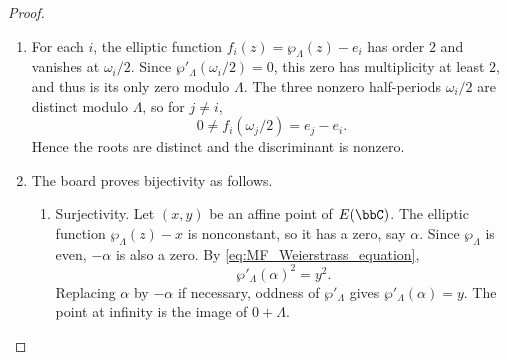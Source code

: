 \begin{proof}
\begin{enumerate}[label=(\arabic*)]
        Since $\wp_\Lambda$ is even, $\wp'_\Lambda$ is odd. For $i = 1, 2, 3$, periodicity gives
        \[
            \wp'_\Lambda(\omega_i/2) = \wp'_\Lambda(-\omega_i/2) = -\wp'_\Lambda(\omega_i/2),
        \]
        so $\wp'_\Lambda(\omega_i/2) = 0$. Substitution into \eqref{eq:MF_Weierstrass_equation} shows that the $e_i$ are roots of the cubic.

        \item For each $i$, the elliptic function $f_i(z) = \wp_\Lambda(z) - e_i$ has order $2$ and vanishes at $\omega_i/2$. Since $\wp'_\Lambda(\omega_i/2) = 0$, this zero has multiplicity at least $2$, and thus is its only zero modulo $\Lambda$. The three nonzero half-periods $\omega_i/2$ are distinct modulo $\Lambda$, so for $j \neq i$,
        \[
            0 \neq f_i(\omega_j/2) = e_j - e_i.
        \]
        Hence the roots are distinct and the discriminant is nonzero.

        \item The board proves bijectivity as follows.
        \begin{enumerate}[label=\textit{Step~\arabic*.}]
            \item Surjectivity.
            Let $(x, y)$ be an affine point of $E(\bbC)$. The elliptic function $\wp_\Lambda(z) - x$ is nonconstant, so it has a zero, say $\alpha$. Since $\wp_\Lambda$ is even, $-\alpha$ is also a zero. By \eqref{eq:MF_Weierstrass_equation},
            \[
                \wp'_\Lambda(\alpha)^2 = y^2.
            \]
            Replacing $\alpha$ by $-\alpha$ if necessary, oddness of $\wp'_\Lambda$ gives $\wp'_\Lambda(\alpha) = y$. The point at infinity is the image of $0 + \Lambda$.


\end{enumerate}
\end{enumerate}
\end{proof}
